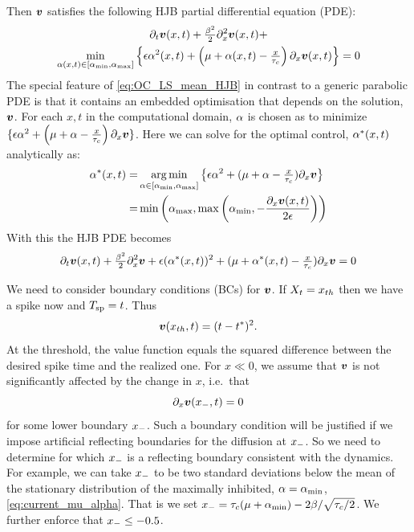 \documentclass[12pt]{iopart}
\begin{document}
Then ${ \boldsymbol{v} }$ satisfies the following HJB partial differential equation (PDE):
\begin{equation}
\begin{gathered}
{\partial}_t { \boldsymbol{v} }(x,t) + \tfrac{{\beta}^2}{2} {\partial}_x^2 { \boldsymbol{v} }(x,t) + \\
\min_{{\alpha}(x,t) \in [{ {\alpha}_{\textrm{min}} },
{ {\alpha}_{\textrm{max}} }]}\Big\{ {\epsilon} {\alpha}^2 (x,t)+ \left({\mu } + {\alpha}(x,t)-\tfrac{x}{{ \tau_{c} }}\right) {\partial}_x
{ \boldsymbol{v} }(x,t) \Big\} = 0
\label{eq:OC_LS_mean_HJB}
\end{gathered}
\end{equation}
The special feature of \cref{eq:OC_LS_mean_HJB} in contrast to a generic
parabolic PDE is that it contains an embedded optimisation that depends on the
solution, ${ \boldsymbol{v} }$. For each $x,t$ in the computational domain,
${\alpha}$ is chosen as to minimize $\{{\epsilon} {\alpha}^2 + \left({\mu } + {\alpha} - \tfrac{x}{{ \tau_{c} }}\right) {\partial}_x { \boldsymbol{v} } \}$.
Here we can solve for the optimal control, ${\alpha}^*(x,t)$ analytically as:
\begin{align}
\a^*(x,t)  =& \argmin_{\a \in [\amin, \amax]}\big\{\e \a^2 + (\m + \a-\tfrac{x}{\tc}) \di_x\v\big\}
\notag
\\
=&
\min \left(\amax, \max\left(\amin, -\frac{\di_x\v(x,t)}{2\e}\right)\right)
\label{eq:OC_LS_variance_energy_quadratic_control}
\end{align}
With this the HJB PDE becomes
\begin{equation}
{\partial}_t { \boldsymbol{v} }(x,t) + \tfrac{{\beta}^2}{2} {\partial}_x^2{ \boldsymbol{v} }+
{\epsilon} ({ {\alpha}^* }(x,t))^2 + ({\mu } + { {\alpha}^* }(x,t)-\tfrac{x}{{ \tau_{c} }}) {\partial}_x{ \boldsymbol{v} }
= 0
\label{eq:OC_LS_mean_HJB_bounded_control}
\end{equation}

We need to consider boundary conditions (BCs) for ${ \boldsymbol{v} }$. If $X_t = { x_{th} }$ then we
have a spike now and ${ T_{\textrm{sp} } } = t$. Thus $$ { \boldsymbol{v} }({ x_{th} },t) = (t-{ t^* })^2.$$ At the
threshold, the value function equals the squared difference between the desired
spike time and the realized one. For $x \ll 0$, we assume that ${ \boldsymbol{v} }$ is not
significantly affected by the change in $x$, i.e.\ that $$ {\partial}_x { \boldsymbol{v} }({ x_{-} }, t) =
0 $$ for some lower boundary ${ x_{-} }$. Such a boundary condition will be
justified if we impose artificial reflecting boundaries for the diffusion at
${ x_{-} }$. So we need to determine for which ${ x_{-} }$ is a reflecting boundary
consistent with the dynamics. For example, we can take ${ x_{-} }$ to be two
standard deviations below the mean of the stationary distribution of the
maximally inhibited, ${\alpha}={ {\alpha}_{\textrm{min}} }$, \cref{eq:current_mu_alpha}. That is we set
${ x_{-} } = { \tau_{c} }(\mu + { {\alpha}_{\textrm{min}} }) - 2 {\beta} / \sqrt{{ \tau_{c} }/2}$. We further enforce
that ${ x_{-} } \leq -0.5$.
\end{document}
